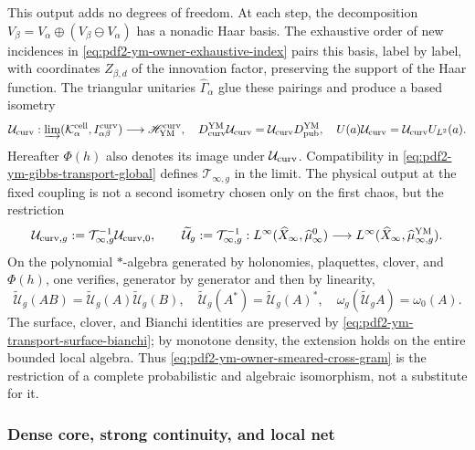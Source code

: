 This output adds no degrees of freedom. At each step, the decomposition
$V_\beta=V_\alpha\oplus(V_\beta\ominus V_\alpha)$ has a nonadic Haar
basis. The exhaustive order of new incidences in
\eqref{eq:pdf2-ym-owner-exhaustive-index} pairs this basis, label by label,
with coordinates $Z_{\beta,d}$ of the innovation factor, preserving the support of the
Haar function. The triangular unitaries $\widehat\Gamma_\alpha$ glue these
pairings and produce a based isometry
\begin{equation}\label{eq:pdf2-ym-owner-publication-into-physical}
 \mathcal U_{\rm curv}:
 \varinjlim(\mathcal K_\alpha^{\rm cell},I_{\alpha\beta}^{\rm curv})
 \longrightarrow\mathscr H_{\rm YM}^{\rm curv},
 \quad
 D_{\rm curv}^{\rm YM}\mathcal U_{\rm curv}
 =\mathcal U_{\rm curv}D_{\rm pub}^{\rm YM},
 \quad U(a)\mathcal U_{\rm curv}=\mathcal U_{\rm curv}U_{L^2}(a).
\end{equation}
Hereafter $\Phi(h)$ also denotes its image under $\mathcal U_{\rm curv}$.
Compatibility in \eqref{eq:pdf2-ym-gibbs-transport-global} defines
$\mathcal T_{\infty,g}$ in the limit. The physical output at the fixed coupling
is not a second isometry chosen only on the first chaos, but the restriction
\begin{equation}\label{eq:pdf2-ym-full-publication-restriction}
 \mathcal U_{{\rm curv},g}
 :=\mathcal T_{\infty,g}^{-1}\mathcal U_{{\rm curv},0},
 \qquad
 \widetilde{\mathcal U}_g
 :=\mathcal T_{\infty,g}^{-1}:
 L^\infty(\widehat X_\infty,\widehat\mu_\infty^0)
 \longrightarrow
 L^\infty(\widehat X_\infty,\widehat\mu_{\infty,g}^{\rm YM}).
\end{equation}
On the polynomial $*$-algebra generated by holonomies, plaquettes, clover, and
$\Phi(h)$, one verifies, generator by generator and then by linearity,
\begin{equation}\label{eq:pdf2-ym-full-publication-products}
 \widetilde{\mathcal U}_g(AB)
 =\widetilde{\mathcal U}_g(A)\widetilde{\mathcal U}_g(B),
 \quad
 \widetilde{\mathcal U}_g(A^*)=\widetilde{\mathcal U}_g(A)^*,
 \quad
 \omega_g(\widetilde{\mathcal U}_gA)=\omega_0(A).
\end{equation}
The surface, clover, and Bianchi identities are preserved by
\eqref{eq:pdf2-ym-transport-surface-bianchi}; by monotone density, the extension
holds on the entire bounded local algebra. Thus
\eqref{eq:pdf2-ym-owner-smeared-cross-gram} is the restriction of a complete
probabilistic and algebraic isomorphism, not a substitute for it.

\subsubsection{Dense core, strong continuity, and local net}

